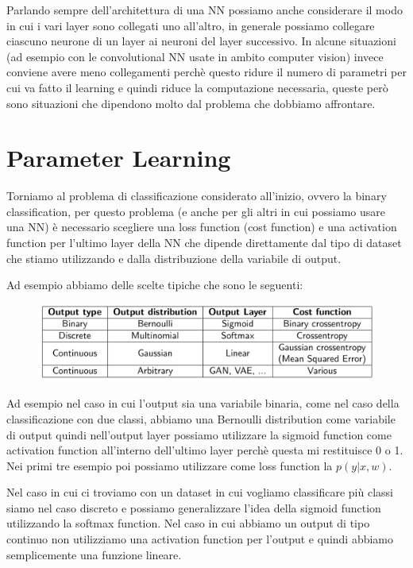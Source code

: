 \documentclass[14pt]{extreport}
\begin{document}
Parlando sempre dell'architettura di una NN possiamo anche considerare il modo in cui i vari layer sono collegati uno all'altro, in generale possiamo
collegare ciascuno neurone di un layer ai neuroni del layer successivo. In alcune situazioni (ad esempio con le convolutional NN usate in ambito
computer vision) invece conviene avere meno collegamenti perchè questo ridure il numero di parametri per cui va fatto il learning e quindi riduce la
computazione necessaria, queste però sono situazioni che dipendono molto dal problema che dobbiamo affrontare. 

\section{Parameter Learning}

Torniamo al problema di classificazione considerato all'inizio, ovvero la binary classification, per questo problema (e anche per gli altri in cui
possiamo usare una NN) è necessario scegliere una loss function (cost function) e una activation function per l'ultimo layer della NN che dipende
direttamente dal tipo di dataset che stiamo utilizzando e dalla distribuzione della variabile di output.

Ad esempio abbiamo delle scelte tipiche che sono le seguenti:

\begin{figure}[H]
\centering
\includegraphics[width=0.7\linewidth]{373.jpeg}
\end{figure}

Ad esempio nel caso in cui l'output sia una variabile binaria, come nel caso della classificazione con due classi, abbiamo una Bernoulli distribution
come variabile di output quindi nell'output layer possiamo utilizzare la sigmoid function come activation function all'interno dell'ultimo layer
perchè questa mi restituisce 0 o 1. Nei primi tre esempio poi possiamo utilizzare come loss function la $p(y|x,w)$.

Nel caso in cui ci troviamo con un dataset in cui vogliamo classificare più classi siamo nel caso discreto e possiamo generalizzare l'idea della
sigmoid function utilizzando la softmax function. Nel caso in cui abbiamo un output di tipo continuo non utilizziamo una activation function per
l'output e quindi abbiamo semplicemente una funzione lineare.
\end{document}
